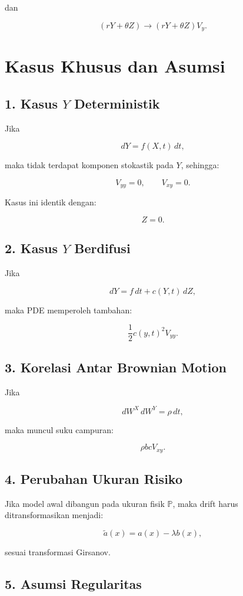 \documentclass[12pt,a4paper]{article}
\begin{document}
dan

\[
(rY+\theta Z)
\longrightarrow
(rY+\theta Z)V_y.
\]

\section{Kasus Khusus dan Asumsi}

\subsection*{1. Kasus $Y$ Deterministik}

Jika

\[
dY=f(X,t)\,dt,
\]

maka tidak terdapat komponen stokastik pada $Y$, sehingga:

\[
V_{yy}=0,
\qquad
V_{xy}=0.
\]

Kasus ini identik dengan:

\[
Z=0.
\]

\subsection*{2. Kasus $Y$ Berdifusi}

Jika

\[
dY=f\,dt+c(Y,t)\,dZ,
\]

maka PDE memperoleh tambahan:

\[
\frac12 c(y,t)^2V_{yy}.
\]

\subsection*{3. Korelasi Antar Brownian Motion}

Jika

\[
dW^X\,dW^Y=\rho\,dt,
\]

maka muncul suku campuran:

\[
\rho bcV_{xy}.
\]

\subsection*{4. Perubahan Ukuran Risiko}

Jika model awal dibangun pada ukuran fisik $\mathbb P$, maka drift harus ditransformasikan menjadi:

\[
\tilde a(x)
=
a(x)-\lambda b(x),
\]

sesuai transformasi Girsanov.

\subsection*{5. Asumsi Regularitas}
\end{document}
